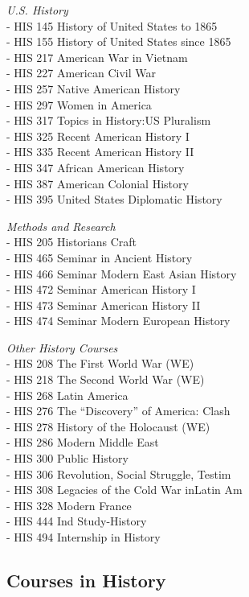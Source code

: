 \documentclass[
  letterpaper,
]{scrbook}
\begin{document}
\emph{U.S. History}\\
- HIS 145 History of United States to 1865\\
- HIS 155 History of United States since 1865\\
- HIS 217 American War in Vietnam\\
- HIS 227 American Civil War\\
- HIS 257 Native American History\\
- HIS 297 Women in America\\
- HIS 317 Topics in History:US Pluralism\\
- HIS 325 Recent American History I\\
- HIS 335 Recent American History II\\
- HIS 347 African American History\\
- HIS 387 American Colonial History\\
- HIS 395 United States Diplomatic History

\emph{Methods and Research}\\
- HIS 205 Historians Craft\\
- HIS 465 Seminar in Ancient History\\
- HIS 466 Seminar Modern East Asian History\\
- HIS 472 Seminar American History I\\
- HIS 473 Seminar American History II\\
- HIS 474 Seminar Modern European History

\emph{Other History Courses}\\
- HIS 208 The First World War (WE)\\
- HIS 218 The Second World War (WE)\\
- HIS 268 Latin America\\
- HIS 276 The ``Discovery'' of America: Clash\\
- HIS 278 History of the Holocaust (WE)\\
- HIS 286 Modern Middle East\\
- HIS 300 Public History\\
- HIS 306 Revolution, Social Struggle, Testim\\
- HIS 308 Legacies of the Cold War inLatin Am\\
- HIS 328 Modern France\\
- HIS 444 Ind Study-History\\
- HIS 494 Internship in History

\subsection{Courses in History}\label{courses-in-history}
\end{document}
